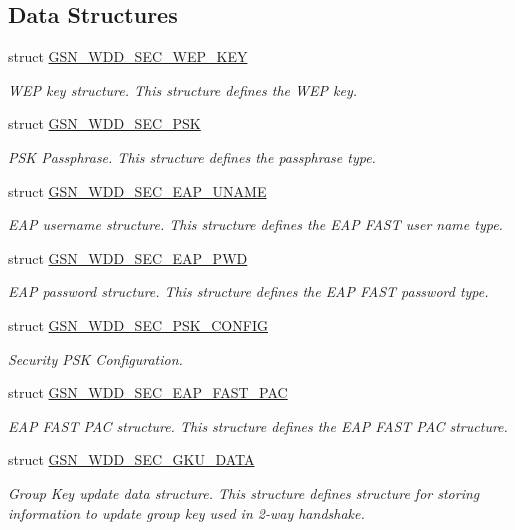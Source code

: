 \subsection*{Data Structures}
\begin{DoxyCompactItemize}
\item 
struct \hyperlink{a00295}{GSN\_\-WDD\_\-SEC\_\-WEP\_\-KEY}
\begin{DoxyCompactList}\small\item\em WEP key structure. This structure defines the WEP key. \end{DoxyCompactList}\item 
struct \hyperlink{a00293}{GSN\_\-WDD\_\-SEC\_\-PSK}
\begin{DoxyCompactList}\small\item\em PSK Passphrase. This structure defines the passphrase type. \end{DoxyCompactList}\item 
struct \hyperlink{a00290}{GSN\_\-WDD\_\-SEC\_\-EAP\_\-UNAME}
\begin{DoxyCompactList}\small\item\em EAP username structure. This structure defines the EAP FAST user name type. \end{DoxyCompactList}\item 
struct \hyperlink{a00289}{GSN\_\-WDD\_\-SEC\_\-EAP\_\-PWD}
\begin{DoxyCompactList}\small\item\em EAP password structure. This structure defines the EAP FAST password type. \end{DoxyCompactList}\item 
struct \hyperlink{a00294}{GSN\_\-WDD\_\-SEC\_\-PSK\_\-CONFIG}
\begin{DoxyCompactList}\small\item\em Security PSK Configuration. \end{DoxyCompactList}\item 
struct \hyperlink{a00288}{GSN\_\-WDD\_\-SEC\_\-EAP\_\-FAST\_\-PAC}
\begin{DoxyCompactList}\small\item\em EAP FAST PAC structure. This structure defines the EAP FAST PAC structure. \end{DoxyCompactList}\item 
struct \hyperlink{a00291}{GSN\_\-WDD\_\-SEC\_\-GKU\_\-DATA}
\begin{DoxyCompactList}\small\item\em Group Key update data structure. This structure defines structure for storing information to update group key used in 2-\/way handshake. \end{DoxyCompactList}\item 

\end{DoxyCompactItemize}
